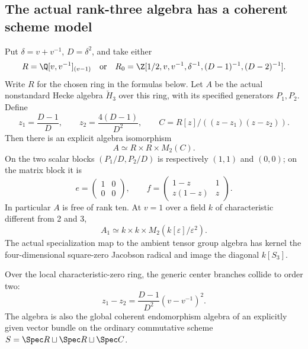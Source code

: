 \subsection{The actual rank-three algebra has a coherent scheme model}
\begin{finding}\label{f:rankthree}
Put $\delta=v+v^{-1}$, $D=\delta^2$, and take either
\[
 R=\Q[v,v^{-1}]_{(v-1)}
 \quad\text{or}\quad
 R_0=\Z[1/2,v,v^{-1},\delta^{-1},(D-1)^{-1},(D-2)^{-1}].
\]
Write $R$ for the chosen ring in the formulas below. Let $A$ be the actual nonstandard Hecke algebra $\check H_3$ over this ring, with its specified generators $P_1,P_2$. Define
\[
 z_1=\frac{D-1}{D},\qquad z_2=\frac{4(D-1)}{D^2},\qquad
 C=R[z]/((z-z_1)(z-z_2)).
\]
Then there is an explicit algebra isomorphism
\begin{equation}\label{eq:r3model}
 A\simeq R\times R\times M_2(C).
\end{equation}
On the two scalar blocks $(P_1/D,P_2/D)$ is respectively $(1,1)$ and $(0,0)$; on the matrix block it is
\[
 e=\begin{pmatrix}1&0\\0&0\end{pmatrix},\qquad
 f=\begin{pmatrix}1-z&1\\z(1-z)&z\end{pmatrix}.
\]
In particular $A$ is free of rank ten. At $v=1$ over a field $k$ of characteristic different from 2 and 3,
\[
 A_1\simeq k\times k\times M_2(k[\varepsilon]/\varepsilon^2).
\]
The actual specialization map to the ambient tensor group algebra has kernel the four-dimensional square-zero Jacobson radical and image the diagonal $k[S_3]$.

Over the local characteristic-zero ring, the generic center branches collide to order two:
\begin{equation}\label{eq:r3collision}
 z_1-z_2=\frac{D-1}{D^2}(v-v^{-1})^2.
\end{equation}
The algebra is also the global coherent endomorphism algebra of an explicitly given vector bundle on the ordinary commutative scheme
$S=\Spec R\sqcup\Spec R\sqcup\Spec C$.
\end{finding}
